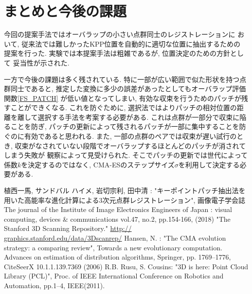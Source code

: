 \documentclass[twocolumn, 9pt, a4j, dvipdfmx]{jsarticle}
\begin{document}
\section{まとめと今後の課題}
今回の提案手法ではオーバラップの小さい点群同士のレジストレーションに
おいて, 従来法では難しかったKPP位置を自動的に適切な位置に抽出するための
提案を行った. 実験では本提案手法は粗雑であるが, 位置決定のための方針として
妥当性が示された. 

一方で今後の課題は多く残されている. 
特に一部が広い範囲で似た形状を持つ点群同士であると, 
推定した変換に多少の誤差があったとしてもオーバラップ評価関数\ref{FS_PATCH}
が低い値となってしまい, 
有効な収束を行うためのパッチが残すことができくなる. 
これを防ぐために, 
選択法ではよりパッチの相対位置の距離を離して選択する手法を考案する必要がある. 
これは点群が一部分で収束に陥ることを防ぎ, 
パッチの更新によって残されるパッチが一部に集中することを防ぐのに有効であると思われる. 
また, 一部の点群のペアでは収束が遅い試行のとき, 
収束がなされていない段階でオーバラップするほとんどのパッチが消されてしまう失敗が
観察によって見受けられた. 
そこでパッチの更新では世代によって係数$k$を決定するのではなく, 
CMA-ESのステップサイズ$\sigma$を利用して決定する必要がある. 


\begin{thebibliography}{1}
 植西一馬, サンドバル ハイメ, 岩切宗利, 田中清 : 
"キーポイントパッチ抽出法を用いた高能率な進化計算による3次元点群レジストレーション", 
画像電子学会誌 The journal of the Institute of Image Electronics Engineers of Japan : 
visual computing, devices \& communications vol.47, no.2, pp.154-166, (2018)
 "The Stanford 3D Scanning Repository." \url{http://
graphics.stanford.edu/data/3Dscanrep/} 
 Hansen, N. : 
"The CMA evolution strategy: a comparing review", Towards a new evolutionary 
computation. Advances on estimation of distribution algorithms, 
Springer, pp. 1769–1776, CiteSeerX 10.1.1.139.7369 (2006)
R.B. Rusu, S. Cousins: "3D is here: Point Cloud Library (PCL)", 
Proc. of IEEE International Conference on Robotics and Automation, pp.1–4, 
IEEE(2011).

\end{thebibliography}
\clearpage
\end{document}
